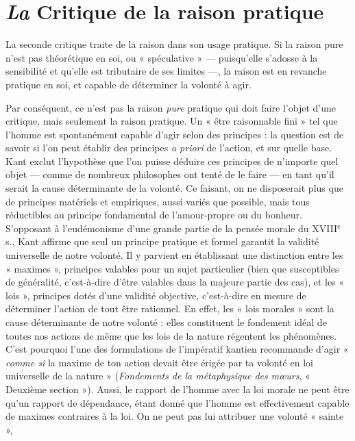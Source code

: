 
\section{{\it La} Critique de la raison pratique}

La seconde critique traite de la raison
dans son usage pratique. Si la raison pure
n’est pas théorétique en soi, ou « spéculative » — 
puisqu'elle s’adosse à la sensibilité
et qu’elle est tributaire de ses limites —, la
raison est en revanche pratique en soi, et
capable de déterminer la volonté à agir.

Par conséquent, ce n’est pas la raison
{\it pure} pratique qui doit faire l’objet d’une
critique, mais seulement la raison pratique.
Un « être raisonnable fini » tel que
l’homme est spontanément capable d’agir
selon des principes : la question est de
savoir si l’on peut établir des principes {\it a
priori} de l’action, et sur quelle base. Kant
exclut l'hypothèse que l’on puisse déduire
ces principes de n'importe quel objet
— comme de nombreux philosophes ont
tenté de le faire — en tant qu'il serait la
cause déterminante de la volonté. Ce faisant,
on ne disposerait plus que de principes
matériels et empiriques, aussi variés
que possible, mais tous réductibles au
principe fondamental de l’amour-propre
ou du bonheur. S’opposant à l’eudémonisme
d’une grande partie de la pensée
morale du {\footnotesize XVIII}$^\text{e}$ s., Kant affirme que seul
un principe pratique et formel garantit la
validité universelle de notre volonté. Il y
parvient en établissant une distinction
entre les « maximes », principes valables
pour un sujet particulier (bien que susceptibles
de généralité, c’est-à-dire d’être
valables dans la majeure partie des cas),
et les « lois », principes dotés d’une validité
objective, c’est-à-dire en mesure de
déterminer l’action de tout être rationnel.
En effet, les « lois morales » sont la cause
déterminante de notre volonté : elles
constituent le fondement idéal de toutes
nos actions de même que les lois de
la nature régentent les phénomènes.
C’est pourquoi l’une des formulations de
l'impératif kantien recommande d’agir
%
« {\it comme si} la maxime de ton action devait
être érigée par ta volonté en loi universelle
de la nature » ({\it Fondements de la
métaphysique des mœurs}, « Deuxième
section »). Aussi, le rapport de l’homme
avec la loi morale ne peut être qu’un rapport
de dépendance, étant donné que
l’homme est effectivement capable de
maximes contraires à la loi. On ne peut
pas lui attribuer une volonté « sainte »,
